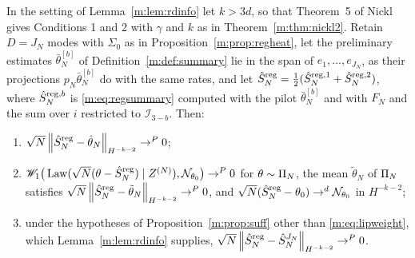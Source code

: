 \begin{proposition}\label{m:prop:regrd}
In the setting of Lemma~\ref{m:lem:rdinfo} let $k>3d$, so that Theorem~5 of Nickl~\cite{nicklbvm2024} gives Conditions 1 and 2 with $\gamma$ and $k$ as in Theorem~\ref{m:thm:nickl2}. Retain $D=J_N$ modes with $\Sigma_0$ as in Proposition~\ref{m:prop:regheat}, let the preliminary estimates $\bar\theta^{[b]}_N$ of Definition~\ref{m:def:summary} lie in the span of $e_1,\dots,e_{J_N}$, as their projections $p_N\bar\theta^{[b]}_N$ do with the same rates, and let $\hat S^{\rm reg}_N=\frac12(\hat S^{{\rm reg},1}_N+\hat S^{{\rm reg},2}_N)$, where $\hat S^{{\rm reg},b}_N$ is \eqref{m:eq:regsummary} computed with the pilot $\bar\theta^{[b]}_N$ and with $F_N$ and the sum over $i$ restricted to $\mathcal I_{3-b}$. Then:
\begin{enumerate}[label=(\roman*),nosep]
\item $\sqrt N\left\|\hat S^{\rm reg}_N-\hat\theta_N\right\|_{H^{-k-2}}\to^P0$;
\item $\mathscr{W}_1\big(\operatorname{Law}(\sqrt N(\theta-\hat S^{\rm reg}_N)\mid Z^{(N)}),\mathcal{N}_{\theta_0}\big)\to^P0$ for $\theta\sim\Pi_N$, the mean $\tilde\theta_N$ of $\Pi_N$ satisfies $\sqrt N\left\|\hat S^{\rm reg}_N-\tilde\theta_N\right\|_{H^{-k-2}}\to^P0$, and $\sqrt N(\hat S^{\rm reg}_N-\theta_0)\to^d\mathcal{N}_{\theta_0}$ in $H^{-k-2}$;
\item under the hypotheses of Proposition~\ref{m:prop:suff} other than \eqref{m:eq:lipweight}, which Lemma~\ref{m:lem:rdinfo} supplies, $\sqrt N\left\|\hat S^{\rm reg}_N-\hat S^{J_N}_N\right\|_{H^{-k-2}}\to^P0$.
\end{enumerate}
\end{proposition}

